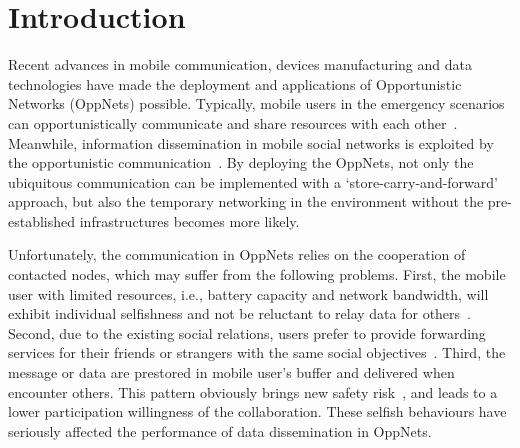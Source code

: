 \section{Introduction}
\label{sec:intro}
Recent advances in mobile communication,
devices manufacturing and data technologies have
made the deployment and applications of Opportunistic Networks
(OppNets) possible.
Typically,
mobile users in the emergency scenarios can
opportunistically communicate and share
resources with each other~\cite{DBLP:journals/tsc/KhalidKKZ14,
DBLP:journals/tmc/ChatzopoulosAKH18,
DBLP:journals/tmc/LiQJHW014}.
Meanwhile,
information dissemination
in mobile social networks is exploited by
the opportunistic communication~\cite{DBLP:journals/tmc/HanHKMSS12}.
By deploying the OppNets,
not only the ubiquitous communication can be
implemented with a `store-carry-and-forward' approach,
but also the temporary networking
in the environment without the pre-established infrastructures
becomes more likely.

Unfortunately,
the communication in OppNets relies on
the cooperation of contacted nodes,
which may suffer from the following problems.
First,
the mobile user with limited resources,
i.e.,
battery capacity
and network bandwidth,
will exhibit individual selfishness and not be
reluctant to relay data for others~\cite{DBLP:journals/comsur/JedariXN18}.
Second,
due to the existing social relations,
users prefer to
provide forwarding services for their friends or strangers
with the same social objectives~\cite{DBLP:journals/tmc/HanHKMSS12}.
Third,
the message or data are prestored in mobile user's buffer
and delivered when encounter others.
This pattern obviously brings new safety risk~\cite{Saha2018Design},
and leads to a lower participation willingness of the collaboration.
These selfish behaviours have seriously
affected the performance
of data dissemination in OppNets.



